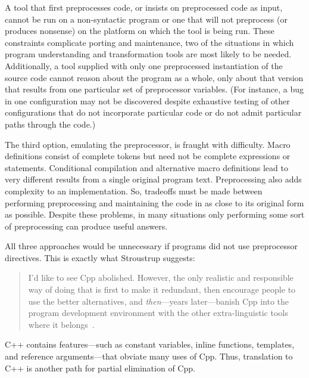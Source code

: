 A tool that first preprocesses code, or insists on preprocessed code as
input, cannot be run on a non-syntactic program or one that will not
preprocess (or produces nonsense) on the platform on which the tool is being
run.  These constraints complicate porting and maintenance, two of the
situations in which program understanding and transformation tools are most
likely to be needed.  Additionally, a tool supplied with only one preprocessed
instantiation of the source code cannot reason about the program as a
whole, only about that version that results from one particular set of
preprocessor variables.  (For instance, a bug in one configuration may not
be discovered despite exhaustive testing of other configurations that do
not incorporate particular code or do not admit particular paths through
the code.)

The third option, emulating the preprocessor, is fraught with difficulty.
Macro definitions consist of complete tokens but need not be complete
expressions or statements.  Conditional compilation and alternative macro
definitions lead to very different results from a single original program
text.  Preprocessing also adds complexity to an implementation.  So,
tradeoffs must be made between performing preprocessing and maintaining the
code in as close to its original form as possible.  Despite these problems,
in many situations only performing some sort of preprocessing can produce
useful answers.

All three approaches would be unnecessary if programs did not use
preprocessor directives.  This is exactly what Stroustrup suggests:
\begin{quote}
  I'd like to see Cpp abolished.  However, the only realistic and
  responsible way of doing that is first to make it redundant, then
  encourage people to use the better alternatives, and {\em then\/}---years
  later---banish Cpp into the program development environment with the
  other extra-linguistic tools where it
  belongs~\cite[p.~426]{Stroustrup-DesignEvolution}.
\end{quote}
C++ contains features---such as constant variables, inline functions,
templates, and reference arguments---that obviate many uses of Cpp.  Thus,
translation to C++
is another path for partial elimination of Cpp.  


